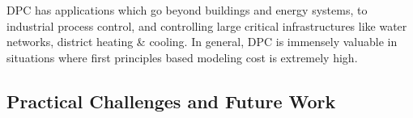 DPC has applications which go beyond buildings and energy systems, to industrial process control, and controlling large critical infrastructures like water networks, district heating \& cooling. In general, DPC is immensely valuable in situations where first principles based modeling cost is extremely high.

\subsection{Practical Challenges and Future Work}
\label{SS:challenges}
